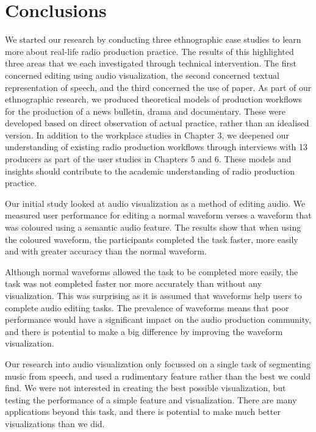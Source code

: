 \chapter{Conclusions}\label{chp:conclusions}


We started our research by conducting three ethnographic case studies to learn more about real-life radio production
practice. The results of this highlighted three areas that we each investigated through technical intervention. The
first concerned editing using audio visualization, the second concerned textual representation of speech, and the third
concerned the use of paper.
As part of our ethnographic research, we produced theoretical models of production workflows for the production of a
news bulletin, drama and documentary. These were developed based on direct observation of actual practice, rather than
an idealised version.
In addition to the workplace studies in Chapter 3, we deepened our understanding of existing radio production workflows
through interviews with 13 producers as part of the user studies in Chapters 5 and 6.
These models and insights should contribute to the academic understanding of radio production practice.


Our initial study looked at audio visualization as a method of editing audio. We measured user performance for editing
a normal waveform verses a waveform that was coloured using a semantic audio feature. The results show that when using
the coloured waveform, the participants completed the task faster, more easily and with greater accuracy than the
normal waveform.

Although normal waveforms allowed the task to be completed more easily, the task was not completed faster nor more
accurately than without any visualization. This was surprising as it is assumed that waveforms help users to complete
audio editing tasks. The prevalence of waveforms means that poor performance would have a significant impact on the
audio production community, and there is potential to make a big difference by improving the waveform visualization.

Our research into audio visualization only focussed on a single task of segmenting music from speech, and used a
rudimentary feature rather than the best we could find. We were not interested in creating the best possible
visualization, but testing the performance of a simple feature and visualization. There are many applications beyond
this task, and there is potential to make much better visualizations than we did.

